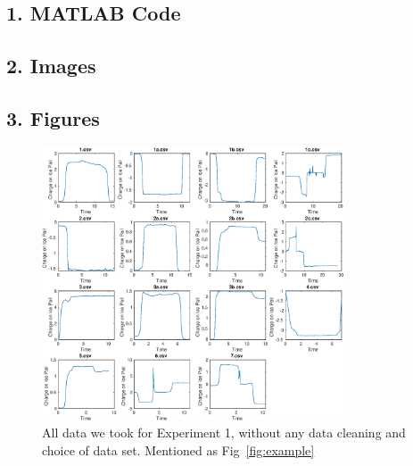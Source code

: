 \documentclass[11pt]{article}
\begin{document}
\subsection{1. MATLAB Code}


\vspace{10pt} %


\vspace{10pt} %


\vspace{10pt} %

\subsection{2. Images}


\subsection{3. Figures}

\begin{figure}[H]
\centering
\includegraphics[width=0.8\textwidth]{./images/figure1.eps}
\caption{All data we took for Experiment 1, without any data cleaning and choice of data set. Mentioned as Fig~\ref{fig:example}}
\end{figure}
\end{document}
